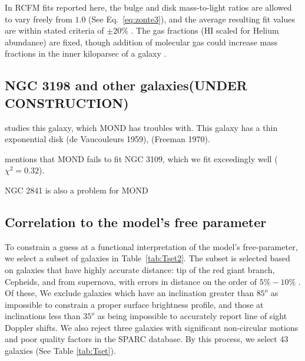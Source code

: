 \documentclass[reprint,%
 amsmath,amssymb,
 aps,
]{revtex4-1}
\begin{document}
 
In RCFM fits reported here, the    bulge and disk mass-to-light ratios are allowed to vary freely from $1.0$ (See Eq.~\ref{eq:zonte3}), and the average resulting fit values are within stated criteria    of $\pm 20\%$ \cite{2016Lelli}. The gas fractions (HI scaled for Helium abundance) are fixed,  though addition of molecular gas could increase mass fractions in the inner kiloparsec of a galaxy   \cite{2004ApJ...609..652M}.


\subsection{NGC 3198 and other galaxies(UNDER CONSTRUCTION)}
\cite{1985ApJAlbada} studies this galaxy, which MOND has troubles with. This galaxy has   a thin exponential disk (de Vaucouleurs 1959),
(Freeman 1970).  
 
\cite{Toky} mentions that MOND fails to fit NGC 3109, which we fit exceedingly well ($\chi^2 = 0.32$).

NGC 2841 is also a problem for MOND
\subsection{Correlation to  the model's free parameter }

To constrain a guess at a functional interpretation of the model's free-parameter, we select a
  subset of galaxies in Table~\ref{tab:Tset2}. The  subset is selected based on
   galaxies that have highly accurate distance:   tip of the red giant branch,  Cepheids, and  from supernova, with errors in distance on the order of $5\% - 10\%$ \cite{2016Lelli}. Of these, We   exclude galaxies  which have an inclination greater than $85^o$ as impossible to constrain a proper surface brightness profile, and those at inclinations less than $35^o$ as being impossible to accurately report line of sight Doppler shifts.  We also reject  three galaxies with significant non-circular motions and poor quality factors in the SPARC database.  
  By this process, we select 43 galaxies (See Table \ref{tab:Tset}). 
  
\end{document}
